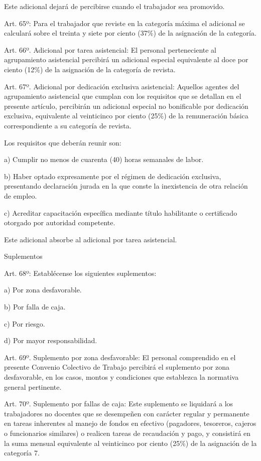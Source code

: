 \documentclass[]{article}
\begin{document}
Este adicional dejará de percibirse cuando el trabajador sea promovido.

Art. 65º: Para el trabajador que reviste en la categoría máxima el
adicional se calculará sobre el treinta y siete por ciento (37\%) de la
asignación de la categoría.

Art. 66º. Adicional por tarea asistencial: El personal perteneciente al
agrupamiento asistencial percibirá un adicional especial equivalente al
doce por ciento (12\%) de la asignación de la categoría de revista.

Art. 67º. Adicional por dedicación exclusiva asistencial: Aquellos
agentes del agrupamiento asistencial que cumplan con los requisitos que
se detallan en el presente artículo, percibirán un adicional especial no
bonificable por dedicación exclusiva, equivalente al veinticinco por
ciento (25\%) de la remuneración básica correspondiente a su categoría
de revista.

Los requisitos que deberán reunir son:

a) Cumplir no menos de cuarenta (40) horas semanales de labor.

b) Haber optado expresamente por el régimen de dedicación exclusiva,
presentando declaración jurada en la que conste la inexistencia de otra
relación de empleo.

c) Acreditar capacitación específica mediante título habilitante o
certificado otorgado por autoridad competente.

Este adicional absorbe al adicional por tarea asistencial.

Suplementos

Art. 68º: Establécense los siguientes suplementos:

a) Por zona desfavorable.

b) Por falla de caja.

c) Por riesgo.

d) Por mayor responsabilidad.

Art. 69º. Suplemento por zona desfavorable: El personal comprendido en
el presente Convenio Colectivo de Trabajo percibirá el suplemento por
zona desfavorable, en los casos, montos y condiciones que establezca la
normativa general pertinente.

Art. 70º. Suplemento por fallas de caja: Este suplemento se liquidará a
los trabajadores no docentes que se desempeñen con carácter regular y
permanente en tareas inherentes al manejo de fondos en efectivo
(pagadores, tesoreros, cajeros o funcionarios similares) o realicen
tareas de recaudación y pago, y consistirá en la suma mensual
equivalente al veinticinco por ciento (25\%) de la asignación de la
categoría 7.
\end{document}
